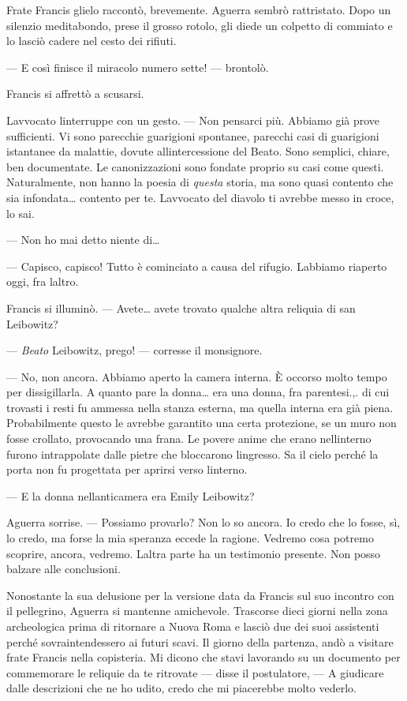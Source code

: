 Frate Francis glielo raccontò, brevemente. Aguerra sembrò rattristato.
Dopo un silenzio meditabondo, prese il grosso rotolo, gli diede un
colpetto di commiato e lo lasciò cadere nel cesto dei rifiuti.

--- E così finisce il miracolo numero sette! --- brontolò.

Francis si affrettò a scusarsi.

L\textquotesingle avvocato l\textquotesingle interruppe con un gesto.
--- Non pensarci più. Abbiamo già prove sufficienti. Vi sono parecchie
guarigioni spontanee, parecchi casi di guarigioni istantanee da
malattie, dovute all\textquotesingle intercessione del Beato. Sono
semplici, chiare, ben documentate. Le canonizzazioni sono fondate
proprio su casi come questi. Naturalmente, non hanno la poesia di
\emph{questa} storia, ma sono quasi contento che sia infondata\ldots{}
contento per te. L\textquotesingle avvocato del diavolo ti avrebbe messo
in croce, lo sai.

--- Non ho mai detto niente di\ldots{}

--- Capisco, capisco! Tutto è cominciato a causa del rifugio.
L\textquotesingle abbiamo riaperto oggi, fra l\textquotesingle altro.

Francis si illuminò. --- Avete\ldots{} avete trovato qualche altra
reliquia di san Leibowitz?

--- \emph{Beato} Leibowitz, prego! --- corresse il monsignore.

--- No, non ancora. Abbiamo aperto la camera interna. È occorso molto
tempo per dissigillarla. A quanto pare la donna\ldots{} era una donna,
fra parentesi.,. di cui trovasti i resti fu ammessa nella stanza
esterna, ma quella interna era già piena. Probabilmente questo le
avrebbe garantito una certa protezione, se un muro non fosse crollato,
provocando una frana. Le povere anime che erano
nell\textquotesingle interno furono intrappolate dalle pietre che
bloccarono l\textquotesingle ingresso. Sa il cielo perché la porta non
fu progettata per aprirsi verso l\textquotesingle interno.

--- E la donna nell\textquotesingle anticamera era Emily Leibowitz?

Aguerra sorrise. --- Possiamo provarlo? Non lo so ancora. Io credo che
lo fosse, sì, lo credo, ma forse la mia speranza eccede la ragione.
Vedremo cosa potremo scoprire, ancora, vedremo. L\textquotesingle altra
parte ha un testimonio presente. Non posso balzare alle conclusioni.

Nonostante la sua delusione per la versione data da Francis sul suo
incontro con il pellegrino, Aguerra si mantenne amichevole. Trascorse
dieci giorni nella zona archeologica prima di ritornare a Nuova Roma e
lasciò due dei suoi assistenti perché sovraintendessero ai futuri scavi.
Il giorno della partenza, andò a visitare frate Francis nella
copisteria. Mi dicono che stavi lavorando su un documento per
commemorare le reliquie da te ritrovate --- disse il postulatore, --- A
giudicare dalle descrizioni che ne ho udito, credo che mi piacerebbe
molto vederlo.

